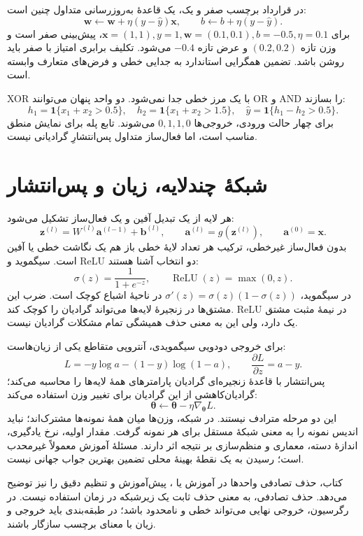 \documentclass[12pt,a4paper,oneside]{report}
\begin{document}
در قرارداد برچسب صفر و یک، یک قاعدهٔ به‌روزرسانی متداول چنین است:
\[\mathbf w\leftarrow\mathbf w+\eta(y-\widehat y)\mathbf x,\qquad b\leftarrow b+\eta(y-\widehat y).\]
برای $\mathbf x=(1,1),y=1,\mathbf w=(0.1,0.1),b=-0.5,\eta=0.1$، پیش‌بینی صفر است و وزن تازه $(0.2,0.2)$ و عرض تازه $-0.4$ می‌شود. تکلیف برابری امتیاز با صفر باید روشن باشد. تضمین همگرایی استاندارد به جدایی خطی و فرض‌های متعارف وابسته است.

XOR با یک مرز خطی جدا نمی‌شود. دو واحد پنهان می‌توانند OR و AND را بسازند:
\[h_1=\mathbf1\{x_1+x_2>0.5\},\quad h_2=\mathbf1\{x_1+x_2>1.5\},\quad \widehat y=\mathbf1\{h_1-h_2>0.5\}.\]
برای چهار حالت ورودی، خروجی‌ها $0,1,1,0$ می‌شوند. تابع پله برای نمایش منطق مناسب است، اما فعال‌ساز متداول پس‌انتشارِ گرادیانی نیست.

\section{شبکهٔ چندلایه، زیان و پس‌انتشار}
هر لایه از یک تبدیل آفین و یک فعال‌ساز تشکیل می‌شود:
\[\mathbf z^{(l)}=W^{(l)}\mathbf a^{(l-1)}+\mathbf b^{(l)},\qquad \mathbf a^{(l)}=g(\mathbf z^{(l)}),\qquad \mathbf a^{(0)}=\mathbf x.\]
بدون فعال‌ساز غیرخطی، ترکیب هر تعداد لایهٔ خطی باز هم یک نگاشت خطی یا آفین است. سیگموید و ReLU دو انتخاب آشنا هستند:
\[\sigma(z)=\frac1{1+e^{-z}},\qquad\operatorname{ReLU}(z)=\max(0,z).\]
در سیگموید، $\sigma'(z)=\sigma(z)(1-\sigma(z))$ در ناحیهٔ اشباع کوچک است. ضرب این مشتق‌ها در زنجیرهٔ لایه‌ها می‌تواند گرادیان را کوچک کند. ReLU در نیمهٔ مثبت مشتق یک دارد، ولی این به معنی حذف همیشگی تمام مشکلات گرادیان نیست.

برای خروجی دودویی سیگمویدی، آنتروپی متقاطع یکی از زیان‌هاست:
\[L=-y\log a-(1-y)\log(1-a),\qquad \frac{\partial L}{\partial z}=a-y.\]
پس‌انتشار با قاعدهٔ زنجیره‌ای گرادیان پارامترهای همهٔ لایه‌ها را محاسبه می‌کند؛ گرادیان‌کاهشی از این گرادیان برای تغییر وزن استفاده می‌کند:
\[\boldsymbol\theta\leftarrow\boldsymbol\theta-\eta\nabla_{\boldsymbol\theta}L.\]
این دو مرحله مترادف نیستند. در شبکه، وزن‌ها میان همهٔ نمونه‌ها مشترک‌اند؛ نباید اندیس نمونه را به معنی شبکهٔ مستقل برای هر نمونه گرفت. مقدار اولیه، نرخ یادگیری، اندازهٔ دسته، معماری و منظم‌سازی بر نتیجه اثر دارند. مسئلهٔ آموزش معمولاً غیرمحدب است؛ رسیدن به یک نقطهٔ بهینهٔ محلی تضمین بهترین جواب جهانی نیست.

کتاب، حذف تصادفی واحدها در آموزش یا ، پیش‌آموزش و تنظیم دقیق را نیز توضیح می‌دهد. حذف تصادفی، به معنی حذف ثابت یک زیرشبکه در زمان استفاده نیست. در رگرسیون، خروجی نهایی می‌تواند خطی و نامحدود باشد؛ در طبقه‌بندی باید خروجی و زیان با معنای برچسب سازگار باشند.
\end{document}

